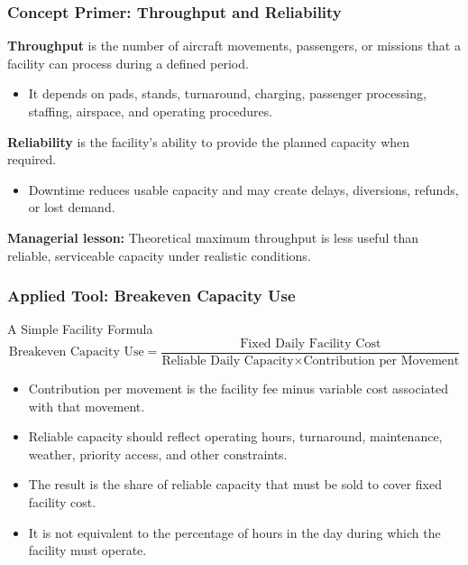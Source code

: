 \documentclass{beamer}
\begin{document}
\begin{frame}[t]
\frametitle{Concept Primer: Throughput and Reliability}
\textbf{Throughput} is the number of aircraft movements, passengers, or missions that a facility can process during a defined period.
\begin{itemize}
\item It depends on pads, stands, turnaround, charging, passenger processing, staffing, airspace, and operating procedures.
\end{itemize}
\textbf{Reliability} is the facility's ability to provide the planned capacity when required.
\begin{itemize}
\item Downtime reduces usable capacity and may create delays, diversions, refunds, or lost demand.
\end{itemize}
\textbf{Managerial lesson:} Theoretical maximum throughput is less useful than reliable, serviceable capacity under realistic conditions.
\end{frame}

\begin{frame}[t]
\frametitle{Applied Tool: Breakeven Capacity Use}
\begin{block}{A Simple Facility Formula}
\[
\text{Breakeven Capacity Use}
=
\frac{\text{Fixed Daily Facility Cost}}
{\text{Reliable Daily Capacity}\times\text{Contribution per Movement}}
\]
\end{block}
\begin{itemize}
\item Contribution per movement is the facility fee minus variable cost associated with that movement.
\item Reliable capacity should reflect operating hours, turnaround, maintenance, weather, priority access, and other constraints.
\item The result is the share of reliable capacity that must be sold to cover fixed facility cost.
\item It is not equivalent to the percentage of hours in the day during which the facility must operate.
\end{itemize}
\end{frame}
\end{document}
